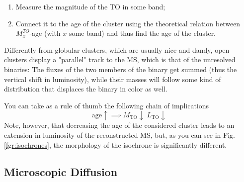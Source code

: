 \begin{enumerate}
    \item Measure the magnitude of the TO in some band;
    \item Connect it to the age of the cluster using the theoretical relation between $M_{x}^{TO}$-age (with $x$ some band) and thus find the age of the cluster.
\end{enumerate}
Differently from globular clusters, which are usually nice and dandy, open clusters display a "parallel" track to the MS, which is that of the unresolved binaries: The fluxes of the two members of the binary get summed (thus the vertical shift in luminosity), while their masses will follow some kind of distribution that displaces the binary in color as well.
\par You can take as a rule of thumb the following chain of implications
\begin{equation*}
    \text{age}\uparrow \implies M_{\text{TO}}\downarrow\;L_{\text{TO}}\downarrow
\end{equation*}
Note, however, that decreasing the age of the considered cluster leads to an extension in luminosity of the reconstructed MS, but, as you can see in Fig.\ref{fgr:isochrones}, the morphology of the isochrone is significantly different.

\subsection{Microscopic Diffusion}

